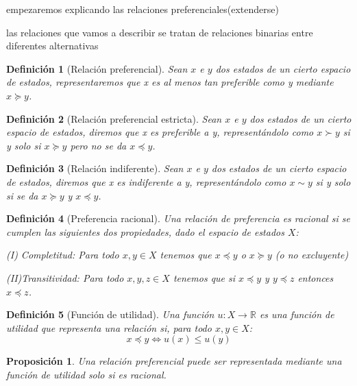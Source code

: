 \documentclass[a4paper]{report} %
\newcommand{\R}{\ensuremath{\mathbb{R}}}
\newtheorem{definicion}{Definición}[section]
\newtheorem{propo}{Proposición}[section]
\begin{document}
empezaremos explicando las relaciones preferenciales(extenderse)


las relaciones que vamos a describir se tratan de relaciones binarias entre diferentes alternativas

\begin{definicion}[Relación preferencial]
 Sean $x$ e $y$ dos estados de un cierto espacio de estados, representaremos que x es al menos tan preferible como y mediante $x \succeq y$. 
\end{definicion}

\begin{definicion}[Relación preferencial estricta]
Sean $x$ e $y$ dos estados de un cierto espacio de estados, diremos que x es preferible a y, representándolo como $x \succ y$ si y solo si $x \succeq y$ pero no se da $x \preceq y$. 
\end{definicion}

\begin{definicion}[Relación indiferente]
Sean $x$ e $y$ dos estados de un cierto espacio de estados, diremos que x es indiferente a y, representándolo como $x \sim y$ si y solo si se da  $x \succeq y$ y $x \preceq y$.
\end{definicion}

\begin{definicion}[Preferencia racional]
Una relación de preferencia es racional si se cumplen las siguientes dos propiedades, dado el espacio de estados $X$:

(I) Completitud: Para todo $x,y \in X$ tenemos que $x \preceq y$ o $x \succeq y$ (o no excluyente)

(II)Transitividad: Para todo $x, y, z \in X$ tenemos que si $x \preceq y$ y $y \preceq z$ entonces $x \preceq z$.
\end{definicion}

\begin{definicion}[Función de utilidad]
Una función $u:X \to \R$ es una función de utilidad que representa una relación si, para todo $x,y \in X$:
$$ 
x \preceq y \iff u(x)\le u(y)
$$

\end{definicion}

\begin{propo}
Una relación preferencial puede ser representada mediante una función de utilidad solo si es racional.
\end{propo}
\end{document}
